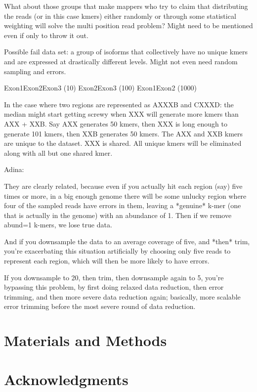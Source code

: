 \documentclass[10pt,draft]{article}
\begin{document}
What about those groups that make mappers who try to claim that
distributing the reads (or in this case kmers) either randomly or
through some statistical weighting will solve the multi position read
problem?  Might need to be mentioned even if only to throw it out.

Possible fail data set: a group of isoforms that collectively have no
unique kmers and are expressed at drastically different levels.  Might
not even need random sampling and errors.

Exon1Exon2Exon3 (10)
Exon2Exon3                (100)
Exon1Exon2             (1000)

In the case where two regions are represented as AXXXB and CXXXD: the
median might start getting screwy when XXX will generate more kmers
than AXX + XXB.  Say AXX generates 50 kmers, then XXX is long enough
to generate 101 kmers, then XXB generates 50 kmers.  The AXX and XXB
kmers are unique to the dataset.  XXX is shared.  All unique kmers
will be eliminated along with all but one shared kmer.

Adina:

They are clearly related, because even if you actually hit each region
(say) five times or more, in a big enough genome there will be some
unlucky region where four of the sampled reads have errors in them,
leaving a *genuine* k-mer (one that is actually in the genome) with an
abundance of 1. Then if we remove abund=1 k-mers, we lose true data.

And if you downsample the data to an average coverage of five, and
*then* trim, you're exacerbating this situation artificially by
choosing only five reads to represent each region, which will then be
more likely to have errors.

If you downsample to 20, then trim, then
downsample again to 5, you're bypassing this problem, by first doing
relaxed data reduction, then error trimming, and then more severe data
reduction again; basically, more scalable error trimming before the
most severe round of data reduction.

\section*{Materials and Methods}

\section*{Acknowledgments}
\end{document}
